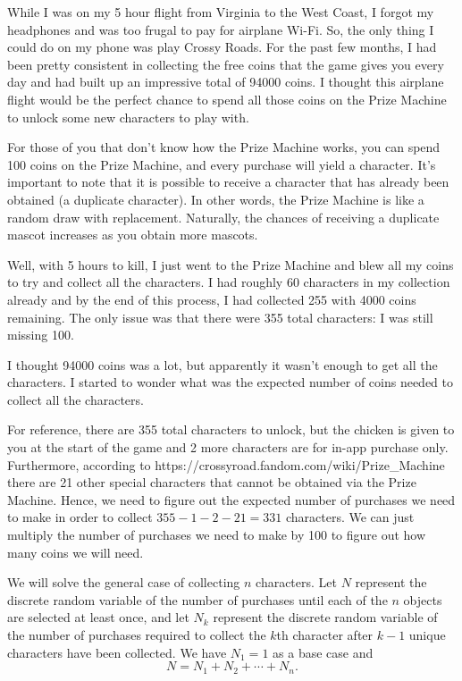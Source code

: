 While I was on my 5 hour flight from Virginia to the West Coast, I forgot my headphones and was too frugal to pay for airplane Wi-Fi. So, the only thing I could do on my phone was play Crossy Roads. For the past few months, I had been pretty consistent in collecting the free coins that the game gives you every day and had built up an impressive total of 94000 coins. I thought this airplane flight would be the perfect chance to spend all those coins on the Prize Machine to unlock some new characters to play with. 

For those of you that don't know how the Prize Machine works, you can spend 100 coins on the Prize Machine, and every purchase will yield a character. It's important to note that it is possible to receive a character that has already been obtained (a duplicate character). In other words, the Prize Machine is like a random draw with replacement. Naturally, the chances of receiving a duplicate mascot increases as you obtain more mascots.

Well, with 5 hours to kill, I just went to the Prize Machine and blew all my coins to try and collect all the characters. I had roughly 60 characters in my collection already and by the end of this process, I had collected 255 with 4000 coins remaining. The only issue was that there were 355 total characters: I was still missing 100. 

I thought 94000 coins was a lot, but apparently it wasn't enough to get all the characters. I started to wonder what was the expected number of coins needed to collect all the characters. 

For reference, there are 355 total characters to unlock, but the chicken is given to you at the start of the game and 2 more characters are for in-app purchase only. Furthermore, according to https://crossyroad.fandom.com/wiki/Prize_Machine there are 21 other special characters that cannot be obtained via the Prize Machine. Hence, we need to figure out the expected number of purchases we need to make in order to collect $355-1-2-21=331$ characters. We can just multiply the number of purchases we need to make by 100 to figure out how many coins we will need.

We will solve the general case of collecting $n$ characters. Let $N$ represent the discrete random variable of the number of purchases until each of the
$n$ objects are selected at least once, and let $N_k$ represent the discrete random variable of the number of purchases required to collect the $k$th character after $k-1$ unique characters have been collected. We have $N_1=1$ as a base case and $$N=N_1+N_2+\cdots+N_n.$$ 

